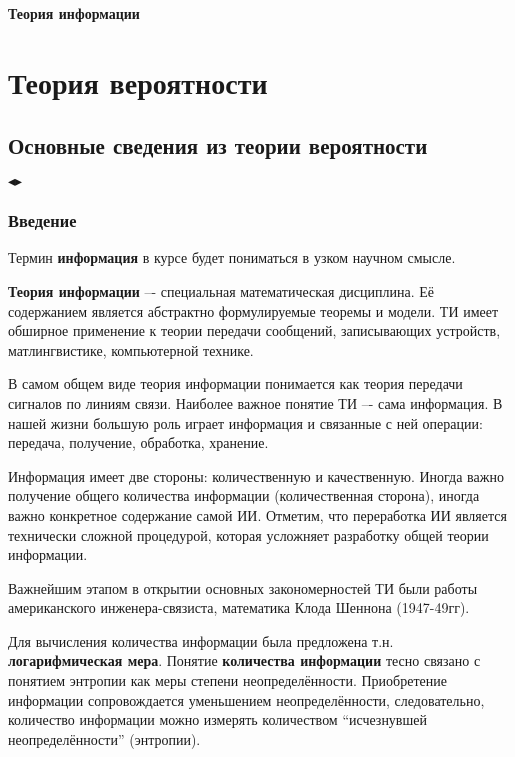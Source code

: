 \documentclass[a4paper,12pt]{report}
\newcommand*{\term}[1]{\textbf{#1}}
\newcommand*{\wdate}[1]{\rule{0pt}{10mm}{\large$\blacktriangleleft$\raisebox{-1pt}{\,\textbf{#1}\,}}$\blacktriangleright$}
\begin{document}
{\Huge\bfseries	Теория информации}





\section{Теория вероятности}





\subsection{Основные сведения из теории вероятности}





\wdate{05.09.13}

\subsubsection{Введение}

	Термин \term{информация} в курсе будет пониматься в узком научном смысле.

	\term{Теория информации} –- специальная математическая дисциплина. Её содержанием является абстрактно формулируемые теоремы и модели. ТИ имеет обширное применение к теории передачи сообщений, записывающих устройств, матлингвистике, компьютерной технике.

	В самом общем виде теория информации понимается как теория передачи сигналов по линиям связи. Наиболее важное понятие ТИ –- сама информация. В нашей жизни большую роль играет информация и связанные с ней операции: передача, получение, обработка, хранение.

	Информация имеет две стороны: количественную и качественную. Иногда важно получение общего количества информации (количественная сторона), иногда важно конкретное содержание самой ИИ. Отметим, что переработка ИИ является технически сложной процедурой, которая усложняет разработку общей теории информации.

	Важнейшим этапом в открытии основных закономерностей ТИ были работы американского инженера-связиста, математика Клода Шеннона (1947-49гг). 

	Для вычисления количества информации была предложена т.н. \term{логарифмическая мера}. Понятие \term{количества информации} тесно связано с понятием энтропии как меры степени неопределённости. Приобретение информации сопровождается уменьшением неопределённости, следовательно, количество информации можно измерять количеством ``исчезнувшей неопределённости'' (энтропии).
\end{document}
